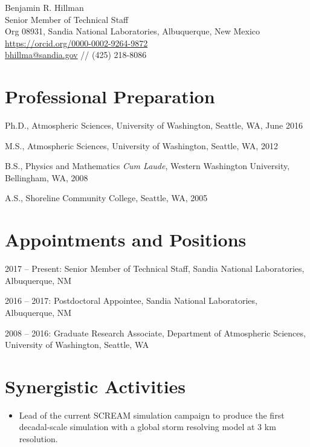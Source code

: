 \documentclass[10pt]{article}
\newenvironment{itemize*}{
   \begin{list}{}
      { 
         \setlength{\itemsep}{5pt}
         \setlength{\parsep}{0pt}
         \setlength{\topsep}{0pt}
         \setlength{\leftmargin}{0em} 
      } 
} {
   \end{list}
}
\begin{document}
{\Large Benjamin R. Hillman} \\ 
{Senior Member of Technical Staff} \\
{Org 08931, Sandia National Laboratories, Albuquerque, New Mexico} \\
{\url{https://orcid.org/0000-0002-9264-9872}} \\
{\url{bhillma@sandia.gov} // (425) 218-8086}

\section*{Professional Preparation}
\begin{itemize*}
    \item Ph.D., Atmospheric Sciences,
    University of Washington, Seattle, WA,
    June 2016
    \item M.S., Atmospheric Sciences,
    University of Washington, Seattle, WA,
    2012
    \item B.S., Physics and Mathematics \textit{Cum Laude},
    Western Washington University, Bellingham, WA,
    2008
    \item A.S.,
    Shoreline Community College, Seattle, WA,
    2005
\end{itemize*}

\section*{Appointments and Positions}
\begin{itemize*}
    \item 2017 -- Present: Senior Member of Technical Staff, Sandia National Laboratories, Albuquerque, NM
    \item 2016 -- 2017: Postdoctoral Appointee, Sandia National Laboratories, Albuquerque, NM
    \item 2008 -- 2016: Graduate Research Associate, Department of Atmospheric Sciences, University of Washington, Seattle, WA
\end{itemize*}

\section*{Synergistic Activities}
\begin{itemize}
    \item Lead of the current SCREAM simulation campaign to produce the first decadal-scale simulation with a global storm resolving model at 3 km resolution.
\end{itemize}

\renewcommand\refname{Selected publications}
\nocite{*}

\end{document}
